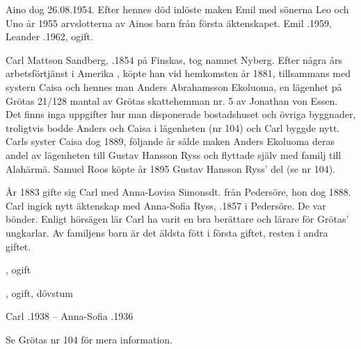 Aino dog 26.08.1954. Efter hennes död inlöste maken Emil med sönerna Leo och Uno år 1955 arvslotterna av Ainos barn från  första äktenskapet.
Emil .1959, Leander .1962, ogift.


Carl Mattson Sandberg, .1854 på Finskas, tog namnet Nyberg. Efter några års arbetsförtjänst i Amerika , köpte han vid hemkomsten år 1881, tillsammans med systern Caisa och hennes man Anders Abrahamsson Ekoluoma, en lägenhet på Grötas 21/128 mantal av Grötas skattehemman nr. 5 av Jonathan von Essen. Det finns inga uppgifter hur man disponerade bostadshuset och övriga byggnader, troligtvis bodde Anders och Caisa i lägenheten (nr 104) och Carl byggde nytt. Carls syster Caisa dog 1889, följande år sålde maken Anders Ekoluoma deras andel av lägenheten till Gustav Hansson Ryss och flyttade själv med familj till Alahärmä. Samuel Roos köpte år 1895 Gustav Hansson Ryss' del (se nr 104).

År 1883 gifte sig Carl med  Anna-Lovisa Simonsdt. från Pedersöre, hon dog 1888. Carl ingick nytt äktenskap med Anna-Sofia Ryss, .1857 i Pedersöre. De var bönder. Enligt hörsägen lär Carl ha varit en bra berättare och lärare för Grötas' ungkarlar. Av familjens barn är det äldsta fött i första giftet, resten i andra giftet.
\begin{jhchildren}
  \item {}, ogift
  \item {}
  \item {}
  \item {}, ogift, dövstum
\end{jhchildren}
Carl .1938  --  Anna-Sofia .1936


Se Grötas nr 104 för mera information.




